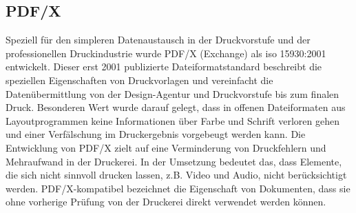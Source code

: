 \subsection{PDF/X}
Speziell für den simpleren Datenaustausch in der Druckvorstufe und der professionellen Druckindustrie wurde PDF/X (Exchange) als \gls{iso} 15930:2001 entwickelt. Dieser erst 2001 publizierte Dateiformatstandard beschreibt die speziellen Eigenschaften von Druckvorlagen und vereinfacht die Datenübermittlung von der Design-Agentur und Druckvorstufe bis zum finalen Druck. Besonderen Wert wurde darauf gelegt, dass in offenen Dateiformaten aus Layoutprogrammen keine Informationen über Farbe und Schrift verloren gehen und einer Verfälschung im Druckergebnis vorgebeugt werden kann. \cite{adobe-pdf-e} Die Entwicklung von PDF/X zielt auf eine Verminderung von Druckfehlern und Mehraufwand in der Druckerei. In der Umsetzung bedeutet das, dass Elemente, die sich nicht sinnvoll drucken lassen, z.B. Video und Audio, nicht berücksichtigt werden. PDF/X-kompatibel bezeichnet die Eigenschaft von Dokumenten, dass sie ohne vorherige Prüfung von der Druckerei direkt verwendet werden können. \cite{adobe-pdf-x} \\
